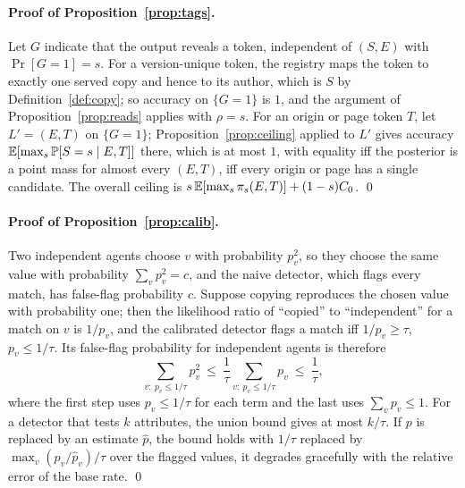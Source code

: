 \paragraph{Proof of Proposition~\ref{prop:tags}.}
Let $G$ indicate that the output reveals a token, independent of $(S,E)$ with $\Pr[G=1]=s$. For a version-unique token, the registry maps the token to exactly one served copy and hence to its author, which is $S$ by Definition~\ref{def:copy}; so accuracy on $\{G=1\}$ is $1$, and the argument of Proposition~\ref{prop:reads} applies with $\rho=s$. For an origin or page token $T$, let $L'=(E,T)$ on $\{G=1\}$; Proposition~\ref{prop:ceiling} applied to $L'$ gives accuracy $\mathbb{E}[\max_s\mathbb{P}[S=s\mid E,T]]$ there, which is at most $1$, with equality iff the posterior is a point mass for almost every $(E,T)$, \ie iff every origin or page has a single candidate. The overall ceiling is $s\,\mathbb{E}[\max_s\pi_s(E,T)]+(1-s)C_0$. \qed

\paragraph{Proof of Proposition~\ref{prop:calib}.}
Two independent agents choose $v$ with probability $p_v^2$, so they choose the same value with probability $\sum_vp_v^2=c$, and the naive detector, which flags every match, has false-flag probability $c$. Suppose copying reproduces the chosen value with probability one; then the likelihood ratio of ``copied'' to ``independent'' for a match on $v$ is $1/p_v$, and the calibrated detector flags a match iff $1/p_v\ge\tau$, \ie $p_v\le1/\tau$. Its false-flag probability for independent agents is therefore
\[
\sum_{v:\ p_v\le1/\tau}p_v^2\ \le\ \frac1\tau\sum_{v:\ p_v\le1/\tau}p_v\ \le\ \frac1\tau,
\]
where the first step uses $p_v\le1/\tau$ for each term and the last uses $\sum_vp_v\le1$. For a detector that tests $k$ attributes, the union bound gives at most $k/\tau$. If $p$ is replaced by an estimate $\hat p$, the bound holds with $1/\tau$ replaced by $\max_v(p_v/\hat p_v)/\tau$ over the flagged values, \ie it degrades gracefully with the relative error of the base rate. \qed

